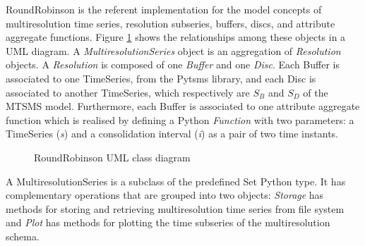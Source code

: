 RoundRobinson is the referent implementation for the model concepts of
multiresolution time series, resolution subseries, buffers, discs, and
attribute aggregate functions. Figure
\ref{fig:implementacio:roundrobinson-uml} shows the relationships
among these objects in a UML diagram. A \emph{MultiresolutionSeries}
object is an aggregation of \emph{Resolution} objects. A
\emph{Resolution} is composed of one \emph{Buffer} and one
\emph{Disc}. Each Buffer is associated to one TimeSeries, from the
Pytsms library, and each Disc is associated to another TimeSeries,
which respectively are $S_B$ and $S_D$ of the MTSMS
model. Furthermore, each Buffer is associated to one attribute
aggregate function which is realised by defining a Python
\emph{Function} with two parameters: a TimeSeries (\emph{s}) and a
consolidation interval (\emph{i}) as a pair of two time instants.




\begin{figure}[tp]
  \centering


  \caption{RoundRobinson UML class diagram}
  \label{fig:implementacio:roundrobinson-uml}
\end{figure}



A MultiresolutionSeries is a subclass of the predefined Set Python
type. It has complementary operations that are grouped into two
objects: \emph{Storage} has methods for storing and retrieving
multiresolution time series from file system and \emph{Plot} has
methods for plotting the time subseries of the multiresolution schema.


